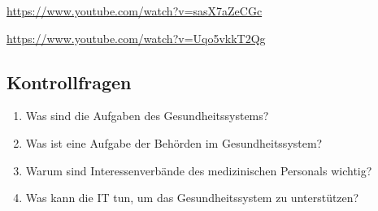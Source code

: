 \begin{description}[align=left]
	\item[Überblick Gesundheitssystem] \href{https://www.youtube.com/watch?v=sasX7aZeCGc}{https://www.youtube.com/watch?v=sasX7aZeCGc}
	\item[Demografischer Wandel und Gesundheitssystem] \href{https://www.youtube.com/watch?v=Uqo5vkkT2Qg}{https://www.youtube.com/watch?v=Uqo5vkkT2Qg}
\end{description}

\subsection{Kontrollfragen}
\begin{enumerate}
	\item Was sind die Aufgaben des Gesundheitssystems?
	\item Was ist eine Aufgabe der Behörden im Gesundheitssystem?
	\item Warum sind Interessenverbände des medizinischen Personals wichtig?
	\item Was kann die IT tun, um das Gesundheitssystem zu unterstützen?
\end{enumerate}
